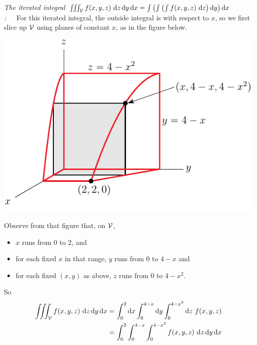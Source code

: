 \begin{eg}
\noindent
\emph{The iterated integral 
   $\tripInt_\cV f(x, y, z)\ \dee{z}\,\dee{y} \,\dee{x}
     =\int\left(\int\left(\int f(x, y, z)\ \dee{z}\right)\dee{y}\right)\dee{x} $:}\ \ \ 
For this iterated integral, the outside integral is with respect to
$x$, so we first slice up $\mathcal{V}$ using planes of constant $x$,
as in the figure below.
\begin{nfig}
\begin{center}
    \includegraphics{limits3dD.pdf}
\end{center}
\end{nfig}
Observe from that figure that, on $\mathcal{V}$,
\begin{itemize}
\item
$x$ runs from $0$ to $2$, and
\item
for each fixed $x$ in that range, $y$ runs from $0$ to $4-x$ and
\item
for each fixed $(x,y)$ as above,
$z$ runs from $0$ to $4-x^2$.
\end{itemize}
So
\begin{align*}
\tripInt_\cV f(x, y, z)\ \dee{z}\,\dee{y} \,\dee{x}
&=\int_0^2 \dee{x} \int_0^{4-x} \dee{y}\int_0^{4-x^2}\dee{z}\  f(x, y, z) \\
&=\int_0^2  \int_0^{4-x} \int_0^{4-x^2}f(x, y, z)\ \dee{z}\,\dee{y}\,\dee{x}
\end{align*}


\end{eg}
